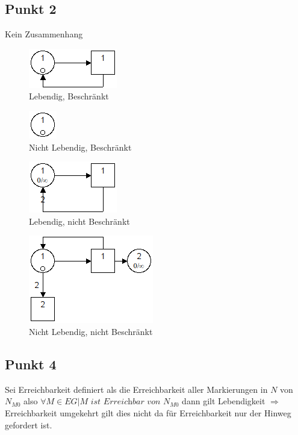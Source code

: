\documentclass[10pt]{scrartcl}
\begin{document}
	\subsection{Punkt 2}
	Kein Zusammenhang
				\begin{figure}[H]
    				\centering	
					\includegraphics[scale=0.5]{aufg021.png}		
            		\caption{Lebendig, Beschränkt}
				\end{figure}
				\begin{figure}[H]
    				\centering	
					\includegraphics[scale=0.5]{aufg022.png}		
            		\caption{Nicht Lebendig, Beschränkt}
				\end{figure}
				\begin{figure}[H]
    				\centering	
					\includegraphics[scale=0.5]{aufg023.png}		
            		\caption{Lebendig, nicht Beschränkt}
				\end{figure}
				\begin{figure}[H]
    				\centering	
					\includegraphics[scale=0.5]{aufg024.png}		
            		\caption{Nicht Lebendig, nicht Beschränkt}
				\end{figure}

		\subsection{Punkt 4}
		Sei Erreichbarkeit definiert als die Erreichbarkeit aller Markierungen in $N$ von $N_{M0}$ also $\forall M \in EG | M \textit{ ist Erreichbar von } N_{M0}$ dann gilt Lebendigkeit $\Longrightarrow$ Erreichbarkeit umgekehrt gilt dies nicht da für Erreichbarkeit nur der Hinweg gefordert ist.
		
\end{document}
